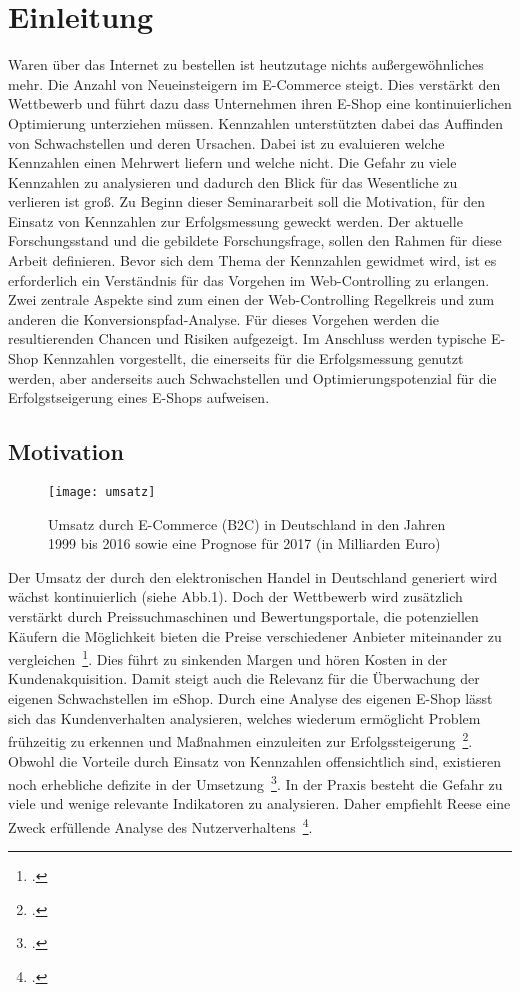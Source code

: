 \section{Einleitung}
Waren über das Internet zu bestellen ist heutzutage nichts außergewöhnliches mehr. Die Anzahl von Neueinsteigern im E-Commerce steigt. Dies verstärkt den Wettbewerb und führt dazu dass Unternehmen ihren E-Shop eine kontinuierlichen Optimierung unterziehen müssen. Kennzahlen unterstützten dabei das Auffinden von Schwachstellen und deren Ursachen. Dabei ist zu evaluieren welche Kennzahlen einen Mehrwert liefern und welche nicht. Die Gefahr zu viele Kennzahlen zu analysieren und dadurch den Blick für das Wesentliche zu verlieren ist groß.
Zu Beginn dieser Seminararbeit soll die Motivation, für den Einsatz von Kennzahlen zur Erfolgsmessung geweckt werden. Der aktuelle Forschungsstand und die gebildete Forschungsfrage, sollen den Rahmen für diese Arbeit definieren. Bevor sich dem Thema der Kennzahlen gewidmet wird, ist es erforderlich ein Verständnis für das Vorgehen im Web-Controlling zu erlangen. Zwei zentrale Aspekte sind zum einen der Web-Controlling Regelkreis und zum anderen die Konversionspfad-Analyse. Für dieses Vorgehen werden die resultierenden Chancen und Risiken aufgezeigt. Im Anschluss werden typische E-Shop Kennzahlen vorgestellt, die einerseits für die Erfolgsmessung genutzt werden, aber anderseits auch Schwachstellen und Optimierungspotenzial für die Erfolgstseigerung eines E-Shops aufweisen.

\subsection{Motivation}

\begin{figure}[H]
	\begin{center}
		\texttt{[image: umsatz]}
		\caption{Umsatz durch E-Commerce (B2C) in Deutschland in den Jahren 1999 bis 2016 sowie eine Prognose für 2017 (in Milliarden Euro)}
	\end{center}
\end{figure}

Der Umsatz der durch den elektronischen Handel in Deutschland generiert wird wächst kontinuierlich (siehe Abb.1). Doch der Wettbewerb wird zusätzlich verstärkt durch Preissuchmaschinen und Bewertungsportale, die potenziellen Käufern die Möglichkeit bieten die Preise verschiedener Anbieter miteinander zu vergleichen~\footcite[Vgl. ]{Geisler.2013}. Dies führt zu sinkenden Margen und hören Kosten in der Kundenakquisition. Damit steigt auch die Relevanz für die Überwachung der eigenen Schwachstellen im eShop. Durch eine Analyse des eigenen E-Shop lässt sich das Kundenverhalten analysieren, welches wiederum ermöglicht Problem frühzeitig zu erkennen und Maßnahmen einzuleiten zur Erfolgssteigerung~\footcite[Vgl. ][Seite 36-37]{Hassler.2010}. Obwohl die Vorteile durch Einsatz von Kennzahlen offensichtlich sind, existieren noch erhebliche defizite in der Umsetzung~\footcite[Vgl. ][Seite 3, 8, 10]{Zumstein.2011}. In der Praxis besteht die Gefahr zu viele und wenige relevante Indikatoren zu analysieren. Daher empfiehlt Reese eine Zweck erfüllende Analyse des Nutzerverhaltens~\footcite[Vgl. ][Seite 42]{Reese.2009}. 

